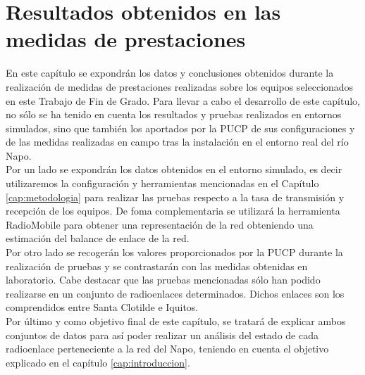 \chapter{Resultados obtenidos en las medidas de prestaciones}
\label{cap:resultaldos_obtenidos}

En este capítulo se expondrán los datos y conclusiones obtenidos durante la realización de medidas de prestaciones realizadas sobre los equipos seleccionados en este Trabajo de Fin de Grado. Para llevar a cabo el desarrollo de este capítulo, no sólo se ha tenido en cuenta los resultados y pruebas realizados en entornos simulados, sino que también los aportados por la PUCP de sus configuraciones y de las medidas realizadas en campo tras la instalación en el entorno real del río Napo.\\

Por un lado se expondrán los datos obtenidos en el entorno simulado, es decir utilizaremos la configuración y herramientas mencionadas en el Capítulo \ref{cap:metodologia} para realizar las pruebas respecto a la tasa de transmisión y recepción de los equipos. De foma complementaria se utilizará la herramienta RadioMobile para obtener una representación de la red obteniendo una estimación del balance de enlace de la red.\\

Por otro lado se recogerán los valores proporcionados por la PUCP durante la realización de pruebas y se contrastarán con las medidas obtenidas en laboratorio. Cabe destacar que las pruebas mencionadas sólo han podido realizarse en un conjunto de radioenlaces determinados. Dichos enlaces son los comprendidos entre Santa Clotilde e Iquitos.\\

Por último y como objetivo final de este capítulo, se tratará de explicar ambos conjuntos de datos para así poder realizar un análisis del estado de cada radioenlace perteneciente a la red del Napo, teniendo en cuenta el objetivo explicado en el capítulo \ref{cap:introduccion}.
 
